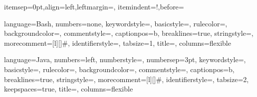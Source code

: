 \makeatletter
\def\BState{\State\hskip-\ALG@thistlm}
\makeatother

\makeatletter
\patchcmd{\@verbatim}
  {\verbatim@font}
  {\verbatim@font\scriptsize}
  {}{}
\makeatother

\newcommand*\makelabelcases[1]{\textit{Q.$#1$}:}
  {itemsep=0pt,align=left,leftmargin=\parindent,
   itemindent=!,before=\let\makelabel\makelabelcases}

   
   
\makeatletter
\newread\pin@file
{}
\newcommand\pin@accu{}
\newcommand\pin@ext{pintmp}
\newcommand*\partialinput [3] {%
  \IfFileExists{#3}{%
    \openin\pin@file #3
    \setcounter{pinlineno}{1}
    \@whilenum\value{pinlineno}<#1 \do{%
      \read\pin@file to\pin@line
      \stepcounter{pinlineno}%
    }
    \addtocounter{pinlineno}{-1}
    \let\pin@accu\empty
    \begingroup
    \endlinechar\newlinechar
    \@whilenum\value{pinlineno}<#2 \do{%
      \readline\pin@file to\pin@line
      \edef\pin@accu{\pin@accu\pin@line}%
      \stepcounter{pinlineno}%
    }
    \closein\pin@file
    \expandafter\endgroup
    \scantokens\expandafter{\pin@accu}%
  }{%
    \errmessage{File `#3' doesn't exist!}%
  }%
}
\makeatother



{ 
    language=Bash,
    numbers=none,     
    keywordstyle=\color{green}\sf,    
    basicstyle=\scriptsize\ttfamily,
    rulecolor=\color{white},
    backgroundcolor=\color{gray},
    commentstyle=\color{gray},
    captionpos=b,    
    breaklines=true,    
    stringstyle=\color{red!60},
    morecomment=[l][\color{magenta}]{\#},
    identifierstyle=\color{green},  
    tabsize=1,
    title=\lstname,
    columns=flexible
}

{ 
    language=Java,
    numbers=left, numberstyle=\tiny, numbersep=3pt,
    keywordstyle=\color{blue}\sf,  
    basicstyle=\scriptsize\ttfamily,
    rulecolor=\color{darkgray},
    backgroundcolor=\color{gray!10},    
    commentstyle=\color{gray},
    captionpos=b,    
    breaklines=true,    
    stringstyle=\color{red!60},
    morecomment=[l][\color{magenta}]{\#},
    identifierstyle=\color{green},  
    tabsize=2,
    keepspaces=true,  
    title=\lstname,
    columns=flexible
}

